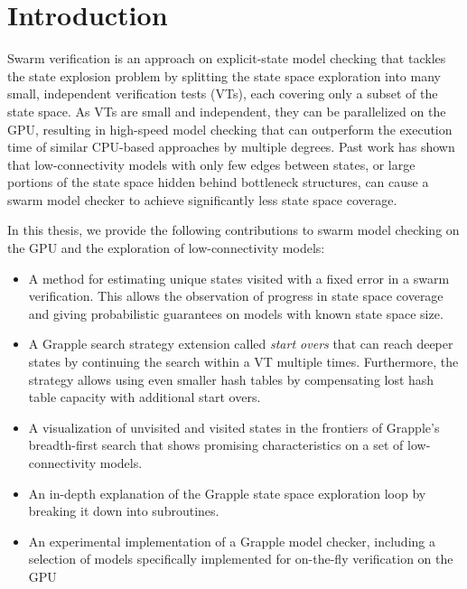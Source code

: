 \documentclass[
fancyheadings, %
%
%
]{stsreprt}
\begin{document}
\tableofcontents
\listofalgorithms
\listoffigures
\listoftables

\mainmatter

\chapter{Introduction}

Swarm verification is an approach on explicit-state model checking that tackles the state explosion problem by splitting the state space exploration into many small, independent verification tests (VTs), each covering only a subset of the state space.
As VTs are small and independent, they can be parallelized on the GPU, resulting in high-speed model checking that can outperform the execution time of similar CPU-based approaches by multiple degrees.
Past work has shown that low-connectivity models with only few edges between states, or large portions of the state space hidden behind bottleneck structures, can cause a swarm model checker to achieve significantly less state space coverage.


In this thesis, we provide the following contributions to swarm model checking on the GPU and the exploration of low-connectivity models:

\begin{itemize}
    \item A method for estimating unique states visited with a fixed error in a swarm verification.
          This allows the observation of progress in state space coverage and giving probabilistic guarantees on models with known state space size.
    \item A Grapple search strategy extension called \emph{start overs} that can reach deeper states by continuing the search within a VT multiple times.
          Furthermore, the strategy allows using even smaller hash tables by compensating lost hash table capacity with additional start overs.
    \item A visualization of unvisited and visited states in the frontiers of Grapple's breadth-first search that shows promising characteristics on a set of low-connectivity models.
    \item An in-depth explanation of the Grapple state space exploration loop by breaking it down into subroutines.
    \item An experimental implementation of a Grapple model checker, including a selection of models specifically implemented for on-the-fly verification on the GPU
\end{itemize}
\end{document}
